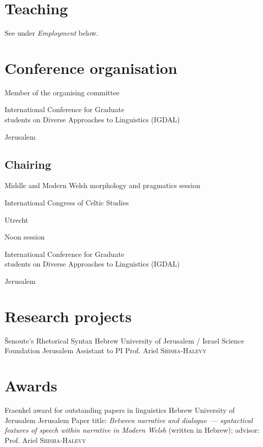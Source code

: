 \section{Teaching}

See under \emph{Employment} below.



\section{Conference organisation}

	{Member of the organising committee}
	{\parbox[t]{0.8\textwidth}{ International Conference for Graduate\\students on Diverse Approaches to Linguistics (IGDAL)}}
	{Jerusalem}
	{}
	{}



\subsection{Chairing}

	{Middle and Modern Welsh morphology and pragmatics session}
	{\parbox[t]{0.8\textwidth}{ International Congress of Celtic Studies}}
	{Utrecht}
	{}
	{}

	{Noon session}
	{\parbox[t]{0.8\textwidth}{ International Conference for Graduate\\students on Diverse Approaches to Linguistics (IGDAL)}}
	{Jerusalem}
	{}
	{}

\section{Research projects}

	{Šenoute’s Rhetorical Syntax}
	{Hebrew University of Jerusalem / Israel Science Foundation}
	{Jerusalem}
	{}
	{Assistant to PI Prof. Ariel \textsc{Shisha-Halevy}}



\section{Awards}

	{Fraenkel award for outstanding papers in linguistics} %
	{Hebrew University of Jerusalem}
	{Jerusalem}
	{}
	{Paper title: \emph{Between narrative and dialogue~— syntactical features of speech within narrative in Modern Welsh} (written in Hebrew); advisor: Prof. Ariel \textsc{Shisha-Halevy}}



